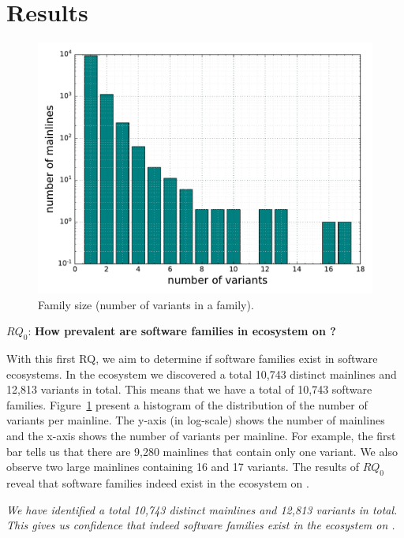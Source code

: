\section{Results}
\label{sec:results}
\begin{figure}[htbp]
\vspace{-.3cm}
   \centering
    \includegraphics[scale=0.4]{figures/variants.pdf}
    \caption{Family size (number of variants in a family).}
   
    \label{fig:variants}
\end{figure}

\noindent
$RQ_0$: \textbf{How prevalent are software families in \js ecosystem on \gh?}

With this first RQ, we aim to determine if software families exist in software ecosystems. In the \js ecosystem we discovered a total 10,743 distinct mainlines and 12,813 variants in total. This means that we have a total of 10,743 software families. Figure~\ref{fig:variants} present a histogram of the distribution of the number of variants per mainline. The y-axis (in log-scale) shows the number of mainlines and  the x-axis shows the number of variants per mainline. For example, the first bar tells us that there are 9,280 mainlines that contain only one variant. We also observe two large mainlines containing 16 and 17 variants. The results of $RQ_0$ reveal that software families indeed exist in the \js ecosystem on \gh.%

\begin{framed}
\noindent
\emph{We have identified a total 10,743 distinct mainlines and 12,813 variants in total. This gives us confidence that indeed software families exist in the \js ecosystem on \gh.}
\end{framed}

